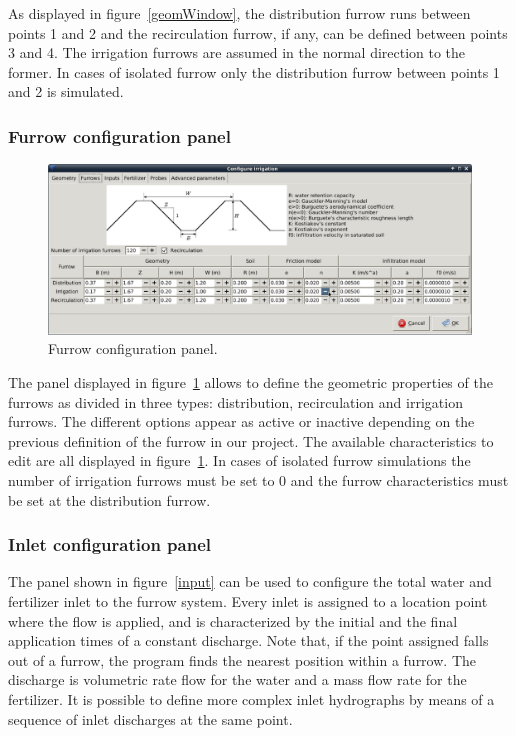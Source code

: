 \documentclass[review,authoryear]{elsarticle}
\begin{document}
As displayed in figure~\ref{geomWindow}, the distribution furrow runs between
points 1 and 2 and the recirculation furrow, if any, can be defined between
points 3 and 4. The irrigation furrows are assumed in the normal direction to
the former. In cases of isolated furrow only the distribution furrow between
points 1 and 2 is simulated.

\subsubsection{Furrow configuration panel}

\begin{figure}[!ht]
\begin{center}
\includegraphics[width=1125\UNIT]{confSurcoEN.eps}
\caption{Furrow configuration panel.}\label{confSurcos}
\end{center}
\end{figure}

The panel displayed in figure~\ref{confSurcos} allows to define the geometric
properties of the furrows as divided in three types: distribution, recirculation
and irrigation furrows. The different options appear as active or inactive
depending on the previous definition of the furrow in our project. The available
characteristics to edit are all displayed in figure~\ref{confSurcos}. In cases
of isolated furrow simulations the number of irrigation furrows must be set to 0
and the furrow characteristics must be set at the distribution furrow.

\subsubsection{Inlet configuration panel}

The panel shown in figure~\ref{input} can be used to configure the total water
and fertilizer inlet to the furrow system. Every inlet is assigned to a location
point where the flow is applied, and is characterized by the initial and the
final application times of a constant discharge. Note that, if the point
assigned falls out of a furrow, the program finds the nearest position within a
furrow. The discharge is volumetric rate flow for the water and a mass flow rate
for the fertilizer. It is possible to define more complex inlet hydrographs by
means of a sequence of inlet discharges at the same point. 
\end{document}
